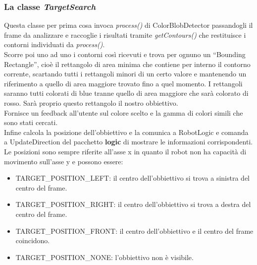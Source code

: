 \subsubsection{La classe \emph{TargetSearch}}
Questa classe per prima cosa invoca \emph{process()} di ColorBlobDetector passandogli
il frame da analizzare e raccoglie i risultati tramite \emph{getContours()} che restituisce 
i contorni individuati da \emph{process()}.\\
Scorre poi uno ad uno i contorni così ricevuti e trova per ognuno un ``Bounding Rectangle'', 
cioè il rettangolo di area minima che contiene per interno il contorno corrente, 
scartando tutti i rettangoli minori di un certo valore e mantenendo un riferimento 
a quello di area maggiore trovato fino a quel momento. I rettangoli saranno tutti colorati di blue
 tranne quello di area maggiore che sarà colorato di rosso. Sarà proprio questo 
 rettangolo il nostro obbiettivo.\\
 Fornisce un feedback all'utente sul colore scelto e la gamma di colori simili 
 che sono stati cercati.\\
 Infine calcola la posizione dell'obbiettivo e la comunica a RobotLogic e comanda 
 a UpdateDirection del pacchetto \textbf{logic} di mostrare le informazioni corrispondenti.
 Le posizioni sono sempre riferite all'asse x in quanto il robot non 
 ha capacità di movimento sull'asse y e possono essere:
 \begin{itemize}
	\item TARGET\_POSITION\_LEFT: il centro dell'obbiettivo si trova a sinistra del centro del frame. 
	\item TARGET\_POSITION\_RIGHT: il centro dell'obbiettivo si trova a destra del centro del frame. 
	\item TARGET\_POSITION\_FRONT: il centro dell'obbiettivo e il centro del frame coincidono. 
	\item TARGET\_POSITION\_NONE: l'obbiettivo non è visibile.
\end{itemize}

